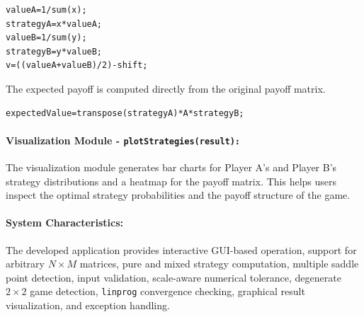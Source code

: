 \begin{lstlisting}[style=code]
valueA=1/sum(x);
strategyA=x*valueA;
valueB=1/sum(y);
strategyB=y*valueB;
v=((valueA+valueB)/2)-shift;
\end{lstlisting}

The expected payoff is computed directly from the original payoff matrix.

\begin{lstlisting}[style=code]
expectedValue=transpose(strategyA)*A*strategyB;
\end{lstlisting}

\paragraph{Visualization Module - \texttt{plotStrategies(result):}}

The visualization module generates bar charts for Player A's and Player B's strategy distributions and a heatmap for the payoff matrix. This helps users inspect the optimal strategy probabilities and the payoff structure of the game.

\paragraph{System Characteristics:}

The developed application provides interactive GUI-based operation, support for arbitrary \(N \times M\) matrices, pure and mixed strategy computation, multiple saddle point detection, input validation, scale-aware numerical tolerance, degenerate \(2 \times 2\) game detection, \texttt{linprog} convergence checking, graphical result visualization, and exception handling.
